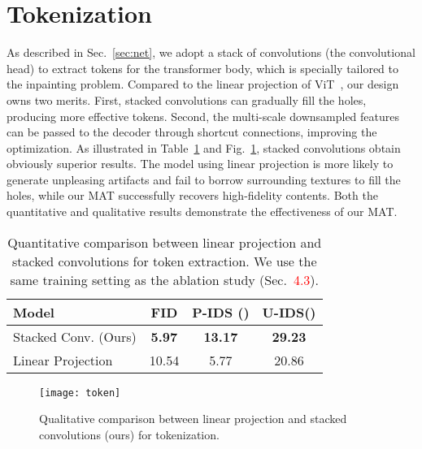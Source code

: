 \documentclass[10pt,twocolumn,letterpaper]{article}
\begin{document}
	\section{Tokenization}
	\label{sec:token}
	
	As described in Sec.~\ref{sec:net}, we adopt a stack of convolutions (the convolutional head) to extract tokens for the transformer body, which is specially tailored to the inpainting problem. Compared to the linear projection of ViT~\cite{dosovitskiy2020image}, our design owns two merits. First, stacked convolutions can gradually fill the holes, producing more effective tokens. Second, the multi-scale downsampled features can be passed to the decoder through shortcut connections, improving the optimization. As illustrated in Table~\ref{tab:lp} and Fig.~\ref{fig:token}, stacked convolutions obtain obviously superior results. The model using linear projection is more likely to generate unpleasing artifacts and fail to borrow surrounding textures to fill the holes, while our MAT successfully recovers high-fidelity contents. Both the quantitative and qualitative results demonstrate the effectiveness of our MAT.
	
	\begin{table}[t]
		\renewcommand\arraystretch{1.1}
		\small
		\begin{center}
\begin{tabular}{ l | c | c| c}
				\hline
				Model & FID & P-IDS () & U-IDS() \\
				\hline
				Stacked Conv. (Ours) & \textbf{5.97} & \textbf{13.17} & \textbf{29.23}\\
				Linear Projection & 10.54 & 5.77 & 20.86 \\
				\hline
			\end{tabular}	
\end{center}
		\vspace{-0.15in}
		\caption{Quantitative comparison between linear projection and stacked convolutions for token extraction. We use the same training setting as the ablation study (Sec.~\textcolor{red}{4.3}).}
		\label{tab:lp}
	\end{table}
	
	\begin{figure}[t]
		\begin{center}
			\texttt{[image: token]}
		\end{center}
		\vspace{-0.15in}
		\caption{Qualitative comparison between linear projection and stacked convolutions (ours) for tokenization.}
		\label{fig:token}
		\vspace{-0.1in}
	\end{figure}
	
\end{document}
